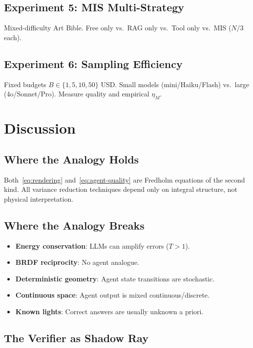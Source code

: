 \documentclass[11pt,twocolumn]{article}
\theoremstyle{definition}
\begin{document}
\subsection{Experiment 5: MIS Multi-Strategy}

Mixed-difficulty Art Bible.
Free only vs.\ RAG only vs.\ Tool only vs.\ MIS ($N/3$ each).

\subsection{Experiment 6: Sampling Efficiency}

Fixed budgets $B \in \{1, 5, 10, 50\}$ USD.
Small models (mini/Haiku/Flash) vs.\ large (4o/Sonnet/Pro).
Measure quality and empirical $\eta_M$.

\section{Discussion}\label{sec:discussion}

\subsection{Where the Analogy Holds}

Both~\eqref{eq:rendering} and~\eqref{eq:agent-quality} are
Fredholm equations of the second kind.
All variance reduction techniques depend only on integral structure,
not physical interpretation.

\subsection{Where the Analogy Breaks}

\begin{itemize}[nosep]
  \item \textbf{Energy conservation}: LLMs can amplify errors ($T > 1$).
  \item \textbf{BRDF reciprocity}: No agent analogue.
  \item \textbf{Deterministic geometry}: Agent state transitions are stochastic.
  \item \textbf{Continuous space}: Agent output is mixed continuous/discrete.
  \item \textbf{Known lights}: Correct answers are usually unknown a priori.
\end{itemize}

\subsection{The Verifier as Shadow Ray}
\end{document}

